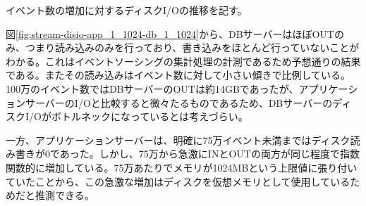 \documentclass[../../../../../main]{subfiles}
\begin{document}
    \label{subsubsec:result-streaming-only-limit-diskio}

    イベント数の増加に対するディスクI/Oの推移を記す。

    

    図\ref{fig:stream-disio-app_1_1024-db_1_1024}から、DBサーバーはほぼOUTのみ、つまり読み込みのみを行っており、書き込みをほとんど行っていないことがわかる。これはイベントソーシングの集計処理の計測であるため予想通りの結果である。またその読み込みはイベント数に対して小さい傾きで比例している。100万のイベント数ではDBサーバーのOUTは約14GBであったが、アプリケーションサーバーのI/Oと比較すると微々たるものであるため、DBサーバーのディスクI/Oがボトルネックになっているとは考えづらい。

    一方、アプリケーションサーバーは、明確に75万イベント未満まではディスク読み書きが0であった。しかし、75万から急激にINとOUTの両方が同じ程度で指数関数的に増加している。75万あたりでメモリが1024MBという上限値に張り付いていたことから、この急激な増加はディスクを仮想メモリとして使用しているためだと推測できる。
\end{document}
